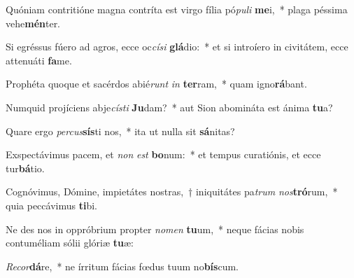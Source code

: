 \item Quóniam contritióne magna contríta est virgo fília pó\textit{pu}\textit{li} \textbf{me}i,~* plaga péssima vehe\textbf{mén}ter.
\item Si egréssus fúero ad agros, ecce oc\textit{cí}\textit{si} \textbf{glá}dio:~* et si introíero in civitátem, ecce attenuáti \textbf{fa}me.
\item Prophéta quoque et sacérdos abié\textit{runt} \textit{in} \textbf{ter}ram,~* quam igno\textbf{rá}bant.
\item Numquid projíciens abje\textit{cís}\textit{ti} \textbf{Ju}dam?~* aut Sion abomináta est ánima \textbf{tu}a?
\item Quare ergo \textit{per}\textit{cus}\textbf{sís}ti nos,~* ita ut nulla sit \textbf{sá}nitas?
\item Exspectávimus pacem, et \textit{non} \textit{est} \textbf{bo}num:~* et tempus curatiónis, et ecce tur\textbf{bá}tio.
\item Cognóvimus, Dómine, impietátes nostras,~† iniquitátes pa\textit{trum} \textit{nos}\textbf{tró}rum,~* quia peccávimus \textbf{ti}bi.
\item Ne des nos in oppróbrium propter \textit{no}\textit{men} \textbf{tu}um,~* neque fácias nobis contuméliam sólii glóriæ \textbf{tu}æ:
\item \textit{Re}\textit{cor}\textbf{dá}re,~* ne írritum fácias fœdus tuum no\textbf{bís}cum.
